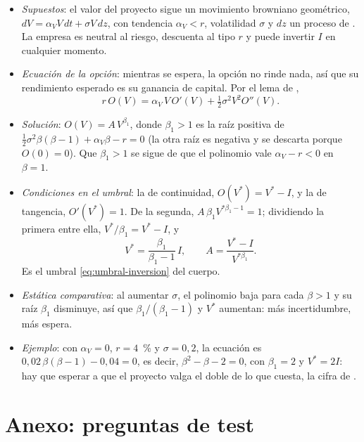 \documentclass[11pt]{article}
\begin{document}
\begin{itemize}
\item \emph{Supuestos}\nocite{DixitPindyck1994}: el valor del proyecto sigue un movimiento browniano geométrico, $dV=\alpha_V V\,dt+\sigma V\,dz$, con tendencia $\alpha_V<r$, volatilidad $\sigma$ y $dz$ un proceso de . La empresa es neutral al riesgo, descuenta al tipo $r$ y puede invertir $I$ en cualquier momento.
\item \emph{Ecuación de la opción}: mientras se espera, la opción no rinde nada, así que su rendimiento esperado es su ganancia de capital. Por el lema de ,
  \begin{equation*}
  r\,O(V)=\alpha_V\,V\,O'(V)+\tfrac{1}{2}\sigma^2V^2O''(V).
  \end{equation*}
\item \emph{Solución}: $O(V)=A\,V^{\beta_1}$, donde $\beta_1>1$ es la raíz positiva de $\tfrac{1}{2}\sigma^2\beta(\beta-1)+\alpha_V\beta-r=0$ (la otra raíz es negativa y se descarta porque $O(0)=0$). Que $\beta_1>1$ se sigue de que el polinomio vale $\alpha_V-r<0$ en $\beta=1$.
\item \emph{Condiciones en el umbral}: la de continuidad, $O(V^*)=V^*-I$, y la de tangencia, $O'(V^*)=1$. De la segunda, $A\,\beta_1V^{*\beta_1-1}=1$; dividiendo la primera entre ella, $V^*/\beta_1=V^*-I$, y
  \begin{equation*}
  V^*=\frac{\beta_1}{\beta_1-1}\,I,\qquad A=\frac{V^*-I}{V^{*\beta_1}}.
  \end{equation*}
  Es el umbral \eqref{eq:umbral-inversion} del cuerpo. \findemo
\item \emph{Estática comparativa}: al aumentar $\sigma$, el polinomio baja para cada $\beta>1$ y su raíz $\beta_1$ disminuye, así que $\beta_1/(\beta_1-1)$ y $V^*$ aumentan: más incertidumbre, más espera.
\item \emph{Ejemplo}: con $\alpha_V=0$, $r=4$~\% y $\sigma=0{,}2$, la ecuación es $0{,}02\,\beta(\beta-1)-0{,}04=0$, es decir, $\beta^2-\beta-2=0$, con $\beta_1=2$ y $V^*=2I$: hay que esperar a que el proyecto valga el doble de lo que cuesta, la cifra de \textcite{McDonaldSiegel1986Value}.
\end{itemize}

\section{Anexo: preguntas de test}\label{anexo:test}
\end{document}
